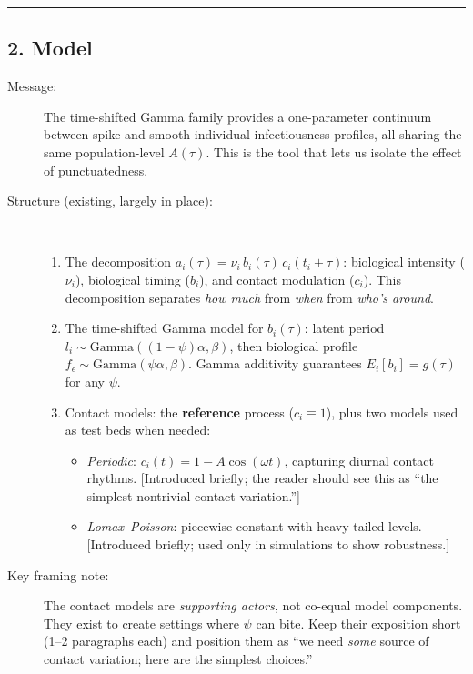 \noindent\rule{\textwidth}{0.4pt}

\subsection*{2. Model}

\begin{description}
    \item[Message:] The time-shifted Gamma family provides a one-parameter continuum between spike and smooth individual infectiousness profiles, all sharing the same population-level $A(\tau)$. This is the tool that lets us isolate the effect of punctuatedness.

    \item[Structure (existing, largely in place):]~
    \begin{enumerate}
        \item The decomposition $a_i(\tau) = \nu_i\, b_i(\tau)\, c_i(t_i + \tau)$: biological intensity ($\nu_i$), biological timing ($b_i$), and contact modulation ($c_i$). This decomposition separates \textit{how much} from \textit{when} from \textit{who's around}.
        \item The time-shifted Gamma model for $b_i(\tau)$: latent period $l_i \sim \text{Gamma}((1-\psi)\alpha, \beta)$, then biological profile $f_\epsilon \sim \text{Gamma}(\psi\alpha, \beta)$. Gamma additivity guarantees $E_i[b_i] = g(\tau)$ for any $\psi$.
        \item Contact models: the \textbf{reference} process ($c_i \equiv 1$), plus two models used as test beds when needed:
        \begin{itemize}
            \item \textit{Periodic}: $c_i(t) = 1 - A\cos(\omega t)$, capturing diurnal contact rhythms. [Introduced briefly; the reader should see this as ``the simplest nontrivial contact variation.'']
            \item \textit{Lomax--Poisson}: piecewise-constant with heavy-tailed levels. [Introduced briefly; used only in simulations to show robustness.]
        \end{itemize}
    \end{enumerate}

    \item[Key framing note:] The contact models are \textit{supporting actors}, not co-equal model components. They exist to create settings where $\psi$ can bite. Keep their exposition short (1--2 paragraphs each) and position them as ``we need \textit{some} source of contact variation; here are the simplest choices.''
\end{description}

